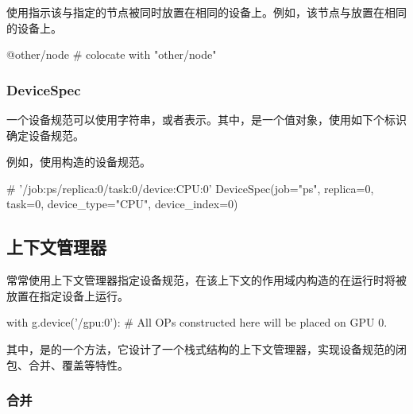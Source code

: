 \begin{content}
使用指示该与指定的节点被同时放置在相同的设备上。例如，该节点与放置在相同的设备上。

\begin{leftbar}
\begin{python}
@other/node  # colocate with "other/node"
\end{python}
\end{leftbar}

\subsubsection{DeviceSpec}

一个设备规范可以使用字符串，或者表示。其中，是一个值对象，使用如下个标识确定设备规范。

\begin{enum}
\end{enum}

例如，使用构造的设备规范。

\begin{leftbar}
\begin{python}
# '/job:ps/replica:0/task:0/device:CPU:0'
DeviceSpec(job="ps", replica=0, task=0, device_type="CPU", device_index=0)
\end{python}
\end{leftbar}

\subsection{上下文管理器}

常常使用上下文管理器指定设备规范，在该上下文的作用域内构造的在运行时将被放置在指定设备上运行。

\begin{leftbar}
\begin{python}
with g.device('/gpu:0'):
  # All OPs constructed here will be placed on GPU 0.
\end{python}
\end{leftbar}

其中，是的一个方法，它设计了一个栈式结构的上下文管理器，实现设备规范的闭包、合并、覆盖等特性。

\subsubsection{合并}


\end{content}

